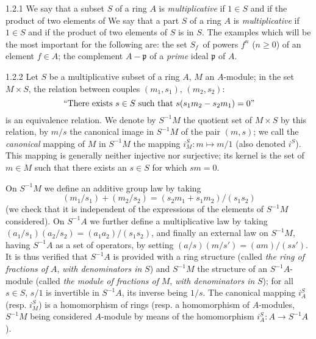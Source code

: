 
\begin{env}{1.2.1}
We say that a subset $S$ of a ring $A$ is \emph{multiplicative} if $1\in S$ and if the product of two elements of
We say that a part $S$ of a ring $A$ is \emph{multiplicative} if $1\in S$ and if the product of two elements of
$S$ is in $S$. The examples which will be the most important for the following are:
 the set $S_f$ of powers $f^n$ ($n\geq 0$) of an element $f\in A$;
 the complement $A-\mathfrak{p}$ of a \emph{prime} ideal $\mathfrak{p}$ of $A$.
\end{env}

\begin{env}{1.2.2}
Let $S$ be a multiplicative subset of a ring $A$, $M$ an $A$-module; in the set $M\times S$, the relation between
couples $(m_1,s_1)$, $(m_2,s_2)$:
\[
   ``\text{There exists } s\in S\text{ such that } s(s_1 m_2-s_2 m_1)=0"
\]
is an equivalence relation. We denote by $S^{-1}M$ the quotient set of $M\times S$ by this relation, by $m/s$ the canonical
image in $S^{-1}M$ of the pair $(m,s)$; we call the \emph{canonical} mapping of $M$ in $S^{-1}M$ the mapping $i_M^S\colon m\mapsto m/1$
(also denoted $i^S$). This mapping is generally neither injective nor surjective; its kernel is the set of $m\in M$ such that there
exists an $s\in S$ for which $sm=0$.

On $S^{-1}M$ we define an additive group law by taking
\[
  (m_1/s_1)+(m_2/s_2)=(s_2 m_1+s_1 m_2)/(s_1 s_2)
\]
(we check that it is independent of the expressions of the elements of $S^{-1}M$ considered). On $S^{-1}A$ we further define
a multiplicative law by taking $(a_1/s_1)(a_2/s_2)=(a_1 a_2)/(s_1 s_2)$, and finally an external law on $S^{-1}M$, having
$S^{-1}A$ as a set of operators, by setting $(a/s)(m/s')=(am)/(ss')$. It is thus verified that $S^{-1}A$ is provided with a
ring structure (called \emph{the ring of fractions of} $A$, \emph{with denominators in} $S$) and $S^{-1}M$ the structure of
an $S^{-1}A$-module (called \emph{the  module of fractions of} $M$, \emph{with denominators in} $S$); for all $s\in S$,
$s/1$ is invertible in $S^{-1}A$, its inverse being $1/s$. The canonical mapping $i_A^S$ (resp. $i_M^S$) is a homomorphism
of rings (resp. a homomorphism of $A$-modules, $S^{-1}M$ being considered $A$-module by means of the homomorphism
$i_A^S\colon A\to S^{-1}A$).
\end{env}

